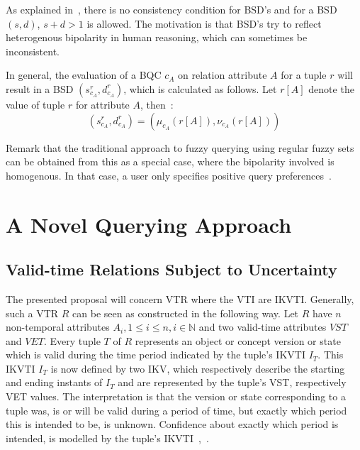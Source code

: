 \documentclass[runningheads,a4paper]{llncs}
\begin{document}
As explained in~\cite{Matthe2011ijis}, there is no consistency condition for BSD's and for a BSD $(s, d)$, $s+d>1$ is allowed. The motivation is that BSD's try to reflect heterogenous bipolarity in human reasoning, which can sometimes be inconsistent.

In general, the evaluation of a BQC $c_{A}$ on relation attribute $A$ for a tuple $r$ will result in a BSD $(s_{c_A}^r, d_{c_A}^r)$, which is calculated as follows. Let $r[A]$ denote the value of tuple $r$ for attribute $A$, then~\cite{Matthe2011ijis}:
\begin{equation}\label{eq:bsdeval}
(s_{c_A}^r, d_{c_A}^r)=(\mu_{c_A}(r[A]), \nu_{c_A}(r[A]))
\end{equation}

Remark that the traditional approach to fuzzy querying using regular fuzzy sets can be obtained from this as a special case, where the bipolarity involved is homogenous. In that case, a user only specifies positive query preferences~\cite{Matthe2011ijis}.


\section{A Novel Querying Approach\label{sec:proposal}}

\subsection{Valid-time Relations Subject to Uncertainty}
The presented proposal will concern VTR where the VTI are IKVTI. Generally, such a VTR $R$ can be seen as constructed in the following way. Let $R$ have $n$ non-temporal attributes $A_{i}, 1 \leq i \leq n, i \in \mathbb{N}$ and two valid-time attributes $VST$ and $VET$. Every tuple $T$ of $R$ represents an object or concept version or state which is valid during the time period indicated by the tuple's IKVTI $I_T$. This IKVTI $I_T$ is now defined by two IKV, which respectively describe the starting and ending instants of $I_T$ and are represented by the tuple's VST, respectively VET values. The interpretation is that the version or state corresponding to a tuple was, is or will be valid during a period of time, but exactly which period this is intended to be, is unknown. Confidence about exactly which period is intended, is modelled by the tuple's IKVTI~\cite{Pons2012ijcis},~\cite{Pons2012ipmu}.
\end{document}
